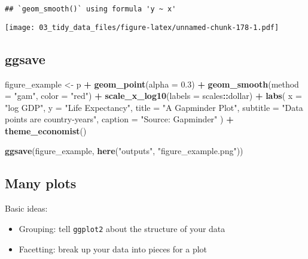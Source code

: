 \documentclass[
]{book}
\newenvironment{Shaded}{\begin{snugshade}}{\end{snugshade}}
\newcommand{\DataTypeTok}[1]{\textcolor[rgb]{0.13,0.29,0.53}{#1}}
\newcommand{\FloatTok}[1]{\textcolor[rgb]{0.00,0.00,0.81}{#1}}
\newcommand{\KeywordTok}[1]{\textcolor[rgb]{0.13,0.29,0.53}{\textbf{#1}}}
\newcommand{\NormalTok}[1]{#1}
\newcommand{\OperatorTok}[1]{\textcolor[rgb]{0.81,0.36,0.00}{\textbf{#1}}}
\newcommand{\StringTok}[1]{\textcolor[rgb]{0.31,0.60,0.02}{#1}}
\providecommand{\tightlist}{%
  \setlength{\itemsep}{0pt}\setlength{\parskip}{0pt}}
\begin{document}
\begin{verbatim}
## `geom_smooth()` using formula 'y ~ x'
\end{verbatim}

\texttt{[image: 03\_tidy\_data\_files/figure-latex/unnamed-chunk-178-1.pdf]}

\hypertarget{ggsave}{%
\subsection{ggsave}\label{ggsave}}

\begin{Shaded}
\begin{Highlighting}[]
\NormalTok{figure\_example \textless{}{-}}\StringTok{ }\NormalTok{p }\OperatorTok{+}\StringTok{ }\KeywordTok{geom\_point}\NormalTok{(}\DataTypeTok{alpha =} \FloatTok{0.3}\NormalTok{) }\OperatorTok{+}
\StringTok{  }\KeywordTok{geom\_smooth}\NormalTok{(}\DataTypeTok{method =} \StringTok{"gam"}\NormalTok{, }\DataTypeTok{color =} \StringTok{"red"}\NormalTok{) }\OperatorTok{+}
\StringTok{  }\KeywordTok{scale\_x\_log10}\NormalTok{(}\DataTypeTok{labels =}\NormalTok{ scales}\OperatorTok{::}\NormalTok{dollar) }\OperatorTok{+}
\StringTok{  }\KeywordTok{labs}\NormalTok{(}
    \DataTypeTok{x =} \StringTok{"log GDP"}\NormalTok{,}
    \DataTypeTok{y =} \StringTok{"Life Expectancy"}\NormalTok{,}
    \DataTypeTok{title =} \StringTok{"A Gapminder Plot"}\NormalTok{,}
    \DataTypeTok{subtitle =} \StringTok{"Data points are country{-}years"}\NormalTok{,}
    \DataTypeTok{caption =} \StringTok{"Source: Gapminder"}
\NormalTok{  ) }\OperatorTok{+}
\StringTok{  }\KeywordTok{theme\_economist}\NormalTok{()}

\KeywordTok{ggsave}\NormalTok{(figure\_example, }\KeywordTok{here}\NormalTok{(}\StringTok{"outputs"}\NormalTok{, }\StringTok{"figure\_example.png"}\NormalTok{))}
\end{Highlighting}
\end{Shaded}

\hypertarget{many-plots}{%
\subsection{Many plots}\label{many-plots}}

Basic ideas:

\begin{itemize}
\tightlist
\item
  Grouping: tell \texttt{ggplot2} about the structure of your data
\item
  Facetting: break up your data into pieces for a plot
\end{itemize}
\end{document}
